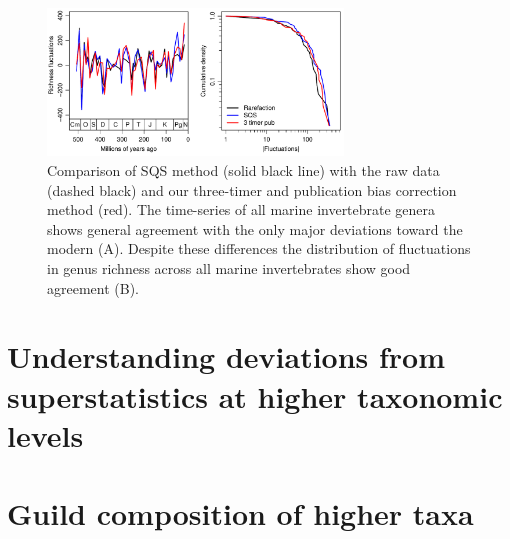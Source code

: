 \documentclass[12pt]{article}
\let\citep=\cite
\begin{document}
\begin{figure}[!hp]
  \centering
  \includegraphics[width=0.7\textwidth]{../../figSupp_divEstComp.pdf}
  \caption[Comparison of SQS method with the raw data and three-timer
  bias correction method]{Comparison of SQS method \citep{alroy2010}
    (solid black line) with the raw data (dashed black) and our
    three-timer and publication bias correction method (red). The
    time-series of all marine invertebrate genera shows general
    agreement with the only major deviations toward the modern
    (A). Despite these differences the distribution of fluctuations in
    genus richness across all marine invertebrates show good
    agreement (B).}
  \label{fig:supp_3TPub}
\end{figure}


\section{Understanding deviations from superstatistics at higher
  taxonomic levels}
\label{sec:suppSstatTaxLevels}


\section{Guild composition of higher taxa}
\label{sec:suppGuilds}
\end{document}
